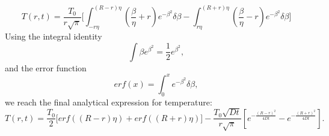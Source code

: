 \begin{equation}
T(r,t) = \frac{T_0}{r\sqrt{\pi}} \bigg[ \int^{(R-r)\eta}_{-r \eta}  \left( \frac{\beta}{\eta} + r\right)e^{-\beta^2}\delta \beta - \int^{(R+r)\eta}_{r \eta}  \left( \frac{\beta}{\eta} - r\right) e^{-\beta^2} \delta \beta \bigg]
\end{equation}
Using the integral identity
\begin{equation}
\int \beta e^{\beta^2} = \frac{1}{2}e^{\beta^2}, 
\end{equation}
and the error function
\begin{equation}
{erf}(x) = \int_0^x e^{-\beta^2} \delta \beta, 
\end{equation}
we reach the final analytical expression for temperature:
\begin{equation}
T(r,t) = \frac{T_0}{2} \bigg[{erf}\left((R-r)\eta\right) + {erf}((R+r)\eta) \bigg] - \frac{T_0\sqrt{Dt}}{r\sqrt{\pi}}\left[ e^{-\frac{(R-r)^2}{4Dt}} - e^{-\frac{(R+r)^2}{4Dt}} \right].
\end{equation}